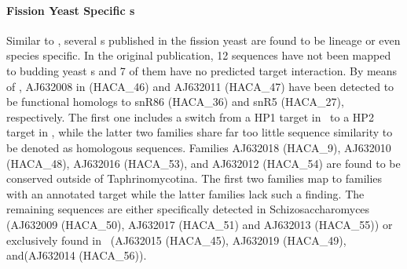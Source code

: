 \paragraph{\textbf{Fission Yeast Specific \sno s}}

%
%
%
Similar to \calb, several \sno s published in the fission yeast
\cite{Li:2005} are found to be lineage or even species specific. In
the original publication, 12 sequences have not been mapped to budding
yeast \sno s and 7 of them have no predicted target interaction. By
means of \snostrip, AJ632008 in \cite{Li:2005} (HACA\_46) and AJ632011
(HACA\_47) have been detected to be functional homologs to snR86
(HACA\_36) and snR5 (HACA\_27), respectively. The first one includes a
switch from a HP1 target in \spo\ to a HP2 target in \sce, while the
latter two families share far too little sequence similarity to be
denoted as homologous sequences. Families AJ632018 (HACA\_9), AJ632010
(HACA\_48), AJ632016 (HACA\_53), and AJ632012 (HACA\_54) are found to
be conserved outside of Taphrinomycotina. The first two families map
to families with an annotated target while the latter families lack
such a finding. The remaining sequences are either specifically
detected in Schizosaccharomyces (AJ632009 (HACA\_50), AJ632017
(HACA\_51) and AJ632013 (HACA\_55)) or exclusively found in \spo\
(AJ632015 (HACA\_45), AJ632019 (HACA\_49), and(AJ632014 (HACA\_56)).


